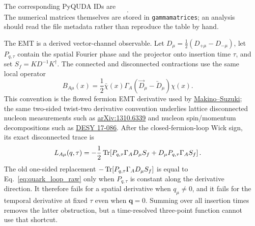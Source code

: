 \documentclass[11pt,a4paper]{article}
\newcommand{\code}[1]{\texttt{\begingroup\def\_{\textunderscore\allowbreak}#1\endgroup}}
\begin{document}
The corresponding PyQUDA IDs are
\begin{equation}
[15,8,7,1,14,2,13,4,11,0,9,3,5,10,6,12].
\end{equation}
The numerical matrices themselves are stored in \code{gamma\_matrices}; an
analysis should read the file metadata rather than reproduce the table by hand.

The EMT is a derived vector-channel observable.  Let
\(D_\mu=\tfrac12(D_{+\mu}-D_{-\mu})\), let \(P_{q,\tau}\) contain the
spatial Fourier phase and the projector onto insertion time \(\tau\), and set
\(S_f=K D^{-1}K^\dagger\).  The connected and disconnected contractions use
the same local operator
\begin{equation}
 B_{A\mu}(x)=\frac12\bar\chi(x)\Gamma_A
 \left(\overrightarrow D_\mu-\overleftarrow D_\mu\right)\chi(x).
\end{equation}
This convention is the flowed fermion EMT derivative used by
\href{https://arxiv.org/abs/1403.4772}{Makino--Suzuki}; the same two-sided
twist-two derivative convention underlies lattice disconnected nucleon
measurements such as \href{https://arxiv.org/abs/1310.6339}{arXiv:1310.6339}
and nucleon spin/momentum decompositions such as
\href{https://www-library.desy.de/preparch/desy/2017/desy17-086.pdf}{DESY 17-086}.
After the closed-fermion-loop Wick sign, its exact disconnected trace is
\begin{equation}
 L_{A\mu}(q,\tau)
 =-\frac12\Tr\!\left[
 P_{q,\tau}\Gamma_A D_\mu S_f
 +D_\mu P_{q,\tau}\Gamma_A S_f\right].
  \label{eq:quark_loop_raw}
\end{equation}
The old one-sided replacement
\(-\Tr[P_{q,\tau}\Gamma_A D_\mu S_f]\) is equal to
Eq.~\eqref{eq:quark_loop_raw} only when \(P_{q,\tau}\) is constant along the
derivative direction.  It therefore fails for a spatial derivative when
\(q_\mu\ne0\), and it fails for the temporal derivative at fixed \(\tau\) even
when \(\mathbf q=0\).  Summing over all insertion times removes the latter
obstruction, but a time-resolved three-point function cannot use that shortcut.
\end{document}
